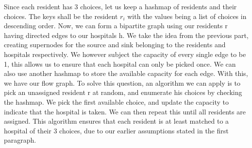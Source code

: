 \documentclass[12pt,letterpaper]{article}
\begin{document}
\begin{enumerate}
    Since each resident has 3 choices, let us keep a hashmap of residents and their choices.
    The keys shall be the resident $r_{i}$ with the values being a list of choices in descending order.
    Now, we can form a bipartite graph using our residents r having directed edges to our hospitals h.
    We take the idea from the previous part, creating supernodes for the source and sink belonging
    to the residents and hospitals respectively.
    We however subject the capacity of every single edge to be 1, 
    this allows us to ensure that each hospital can only be picked once.
    We can also use another hashmap to store the available capacity for each edge. 
    With this, we have our flow graph.
    To solve this question, an algorithm we can apply is to pick an unassigned resident r at random,
    and enumerate his choices by checking the hashmap.
    We pick the first available choice, and update the capacity to indicate that the hospital is taken.
    We can then repeat this until all residents are assigned.
    This algorithm ensures that each resident is at least matched to a hospital of their 3 choices,
    due to our earlier assumptions stated in the first paragraph.
\end{enumerate}
\end{document}
